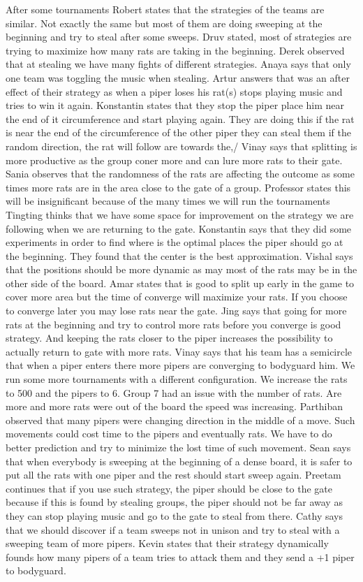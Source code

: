 After some tournaments Robert states that the strategies of the teams are similar. Not exactly the same but most of them are doing sweeping at the beginning and try to steal after some sweeps. 
Druv stated, most of strategies are trying to maximize how many rats are taking in the beginning.
Derek observed that at stealing we have many fights of different strategies.
Anaya says that only one team was toggling the music when stealing.
Artur answers that was an after effect of their strategy as when a piper loses his rat(s) stops playing music and tries to win it again.
Konstantin states that they stop the piper place him near the end of it circumference and start playing again. They are doing this if the rat is near the end of the circumference of the other piper they can steal them if the random direction, the rat will follow are towards the,/
Vinay says that splitting is more productive as the group coner more and can lure more rats to their gate.
Sania observes that the randomness of the rats are affecting the outcome as some 
times more rats are in the area close to the gate of a group.
Professor states this will be insignificant because of the many times we will run the tournaments
Tingting thinks that we have some space for improvement on the strategy we are 
following when we are returning to the gate.
Konstantin says that they did some experiments in order to find where is the optimal 
places the piper should go at the beginning. They found that the center is the 
best approximation.
Vishal says that the positions should be more dynamic as may most of the rats may 
be in the other side of the board.
Amar states that is good to split up early in the game to cover more area but the 
time of converge will maximize your rats. If you choose to converge later you may 
lose rats near the gate. 
Jing says that going for more rats at the beginning and try to control more rats 
before you converge is good strategy. And keeping the rats closer to the piper 
increases the possibility to actually return to gate with more rats.
Vinay says that his team has a semicircle that when a piper enters there more 
pipers are converging to bodyguard him.
We run some more tournaments with a different configuration. We increase the rats 
to 500 and the pipers to 6. Group 7 had an issue with the number of rats. Are more 
and more rats were out of the board the speed was increasing. 
Parthiban observed that many pipers were changing direction in the middle of a 
move. Such movements could cost time to the pipers and eventually rats. We have 
to do better prediction and try to minimize the lost time of such movement.
Sean says that when everybody is sweeping at the beginning of a dense board, it 
is safer to put all the rats with one piper and the rest should start sweep again.
Preetam continues that if you use such strategy, the piper should be close to the 
gate because if this is found by stealing groups, the piper should not be far away 
as they can stop playing music and go to the gate to steal from there.
Cathy says that we should discover if a team sweeps not in unison and try to 
steal with a sweeping team of more pipers.
Kevin states that their strategy dynamically founds how many pipers of a team 
tries to attack them and they send a +1 piper to bodyguard.

